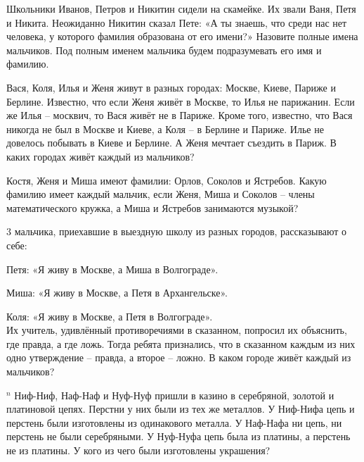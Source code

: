 

\begin{thm}
    Школьники Иванов, Петров и Никитин сидели на скамейке. Их звали Ваня, Петя и Никита. Неожиданно Никитин сказал Пете: «А ты знаешь, что среди нас нет человека, у которого фамилия образована от его имени?» Назовите полные имена мальчиков. Под полным именем мальчика будем подразумевать его имя и фамилию.
\end{thm}

\begin{thm}
    Вася, Коля, Илья и Женя живут в разных городах: Москве, Киеве, Париже и Берлине. Известно, что если Женя живёт в Москве, то Илья не парижанин. Если же Илья – москвич, то Вася живёт не в Париже. Кроме того, известно, что Вася никогда не был в Москве и Киеве, а Коля – в Берлине и Париже. Илье не довелось побывать в Киеве и Берлине. А Женя мечтает съездить в Париж. В каких городах живёт каждый из мальчиков?
\end{thm}

\begin{thm}
    Костя, Женя и Миша имеют фамилии: Орлов, Соколов и Ястребов. Какую фамилию имеет каждый мальчик, если Женя, Миша и Соколов – члены математического кружка, а Миша и Ястребов занимаются музыкой?
\end{thm}

\begin{thm}
    3 мальчика, приехавшие в выездную школу из разных городов, рассказывают о себе:
    \par
    Петя: «Я живу в Москве, а Миша в Волгограде».
    \par
    Миша: «Я живу в Москве, а Петя в Архангельске».
    \par
    Коля: «Я живу в Москве, а Петя в Волгограде».
    \\
    Их учитель, удивлённый противоречиями в сказанном, попросил их объяснить, где правда, а где ложь. Тогда ребята признались, что в сказанном каждым из них одно утверждение – правда, а второе – ложно. В каком городе живёт каждый из мальчиков?
\end{thm}

\begin{thm} $^n$
    Ниф-Ниф, Наф-Наф и Нуф-Нуф пришли в казино в серебряной, золотой и платиновой цепях. Перстни у них были из тех же металлов. У Ниф-Нифа цепь и перстень были изготовлены из одинакового металла. У Наф-Нафа ни цепь, ни перстень не были серебряными. У Нуф-Нуфа цепь была из платины, а перстень не из платины. У кого из чего были изготовлены украшения?
\end{thm}

